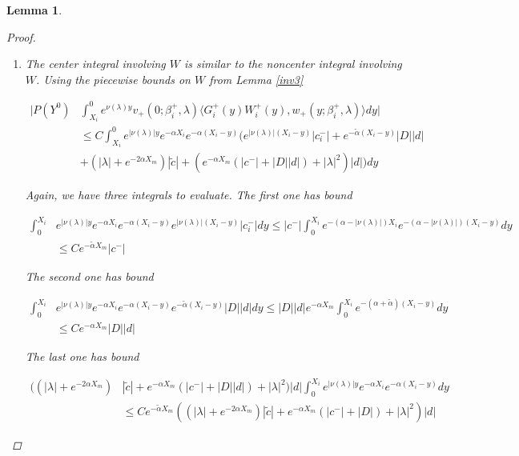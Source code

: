 \documentclass[12pt]{article}
\newtheorem{lemma}{Lemma}
\begin{document}
\begin{lemma}
\begin{proof}
\begin{enumerate}
Note that this bound will be subsumed by the one for the center integral terms (to follow).

\item The center integral involving $W$ is similar to the noncenter integral involving $W$. Using the piecewise bounds on $W$ from Lemma \ref{inv3} 

\begin{align*}
\Big| P(Y^0) &\int_{X_i}^0 e^{\nu(\lambda)y} v_+(0; \beta_i^+, \lambda) \langle G_i^+(y)W_i^+(y), w_+(y; \beta_i^+, \lambda) \rangle dy \Big| \\
&\leq C \int_{X_i}^0 e^{|\nu(\lambda)|y} e^{-\alpha X_i} e^{-\alpha (X_i - y)} ( e^{|\nu(\lambda)|(X_i - y)} |c_i^-| + e^{-\tilde{\alpha}(X_i - y)}|D||d| \\
&+ (|\lambda| + e^{-2 \alpha X_m}) |\tilde{c}| +  ( e^{-\alpha X_m}( |c^-| + |D||d| ) + |\lambda|^2) |d|) dy
\end{align*}

Again, we have three integrals to evaluate. The first one has bound

\begin{align*}
\int_0^{X_i} & e^{|\nu(\lambda)|y} e^{-\alpha X_i} e^{-\alpha (X_i - y)} e^{|\nu(\lambda)|(X_i - y)} |c_i^-| dy \leq |c^-| \int_0^{X_i} e^{-(\alpha - |\nu(\lambda)|) X_i} e^{-(\alpha - |\nu(\lambda)|) (X_i - y)} dy \\ 
&\leq C e^{-\tilde{\alpha} X_m} |c^-|
\end{align*}

The second one has bound

\begin{align*}
\int_0^{X_i} &e^{|\nu(\lambda)|y} e^{-\alpha X_i} e^{-\alpha (X_i - y)} e^{-\tilde{\alpha}(X_i - y)}|D||d|  dy \leq |D| |d| e^{-\alpha X_m } \int_0^{X_i} e^{-(\alpha + \tilde{\alpha})(X_i - y) } dy \\
&\leq C e^{-\alpha X_m } |D||d|
\end{align*}

The last one has bound

\begin{align*}
( (|\lambda| + e^{-2 \alpha X_m}) &|\tilde{c}| + e^{-\alpha X_m}( |c^-| + |D| |d| ) + |\lambda|^2) |d| \int_0^{X_i} e^{|\nu(\lambda)|y} e^{-\alpha X_i} e^{-\alpha (X_i - y)} dy \\
&\leq C e^{-\tilde{\alpha} X_m } ( (|\lambda| + e^{-2 \alpha X_m}) |\tilde{c}| + e^{-\alpha X_m}( |c^-| + |D| ) + |\lambda|^2) |d|
\end{align*}


\end{enumerate}
\end{proof}
\end{lemma}
\end{document}
